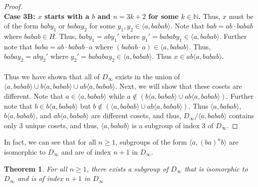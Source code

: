 \documentclass{article}
\newtheorem{theorem}{Theorem}
\theoremstyle{definition}
\begin{document}
\begin{proof}
\\
\textbf{Case 3B: $x$ starts with a $b$ and $n=3k+2$ for some $k\in\mathbb{N}$.} Thus, $x$ must be of the form $baby_1$ or $babay_2$ for some $y_1,y_2\in \langle a,babab\rangle$. Note that $bab=ab\cdot babab$ where $babab\in H$. Thus, $baby_1=aby_1'$ where $y_1'=bababy_1\in \langle a,babab\rangle$. Further note that $baba=ab\cdot babab\cdot a$ where $(babab\cdot a)\in \langle a,babab\rangle$. Thus, $babay_2=aby_2'$ where $y_2'=bababay_2\in \langle a,babab\rangle$. Thus $x\in ab\langle a,babab\rangle$.\\
\\
Thus we have shown that all of $D_\infty$ exists in the union of $\langle a,babab\rangle\cup b\langle a,babab\rangle\cup ab\langle a,babab\rangle$. Next, we will show that these cosets are different. Note that $a\in \langle a,babab\rangle$ while $a\notin (b\langle a,babab\rangle\cup ab\langle a,babab\rangle)$. Further note that $b\in b\langle a,babab\rangle$ but $b\notin (\langle a,babab\rangle\cup ab\langle a,babab\rangle)$. Thus $\langle a,babab\rangle$, $b\langle a,babab\rangle$, and $ab\langle a,babab\rangle$ are different cosets, and thus, $D_\infty/\langle a,babab\rangle$ contains only $3$ unique cosets, and thus, $\langle a, babab\rangle$ is a subgroup of index $3$ of $D_\infty$.
\end{proof}
\begin{center}\end{center}

\noindent In fact, we can see that for all $n \geq 1$, subgroups of the form $\langle a,(ba)^{n}b \rangle$ are isomorphic to $D_\infty$ and are of index $n+1$ in $D_\infty$.

\begin{theorem}
    For all $n \geq 1$, there exists a subgroup of $D_\infty$ that is isomorphic to $D_\infty$ and is of index $n+1$ in $D_\infty$
\end{theorem}
\end{document}
